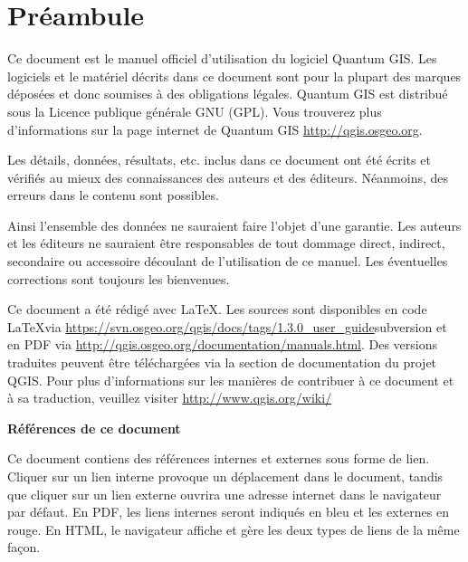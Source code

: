 \newcommand\qgistip[1]{\raggedright\small{#1}}
\renewcommand{\topfraction}{0.85}
\renewcommand{\textfraction}{0.1}
\renewcommand{\floatpagefraction}{0.75}

\thispagestyle{empty}

\section*{Préambule}

\vspace{1cm}

Ce document est le manuel officiel d'utilisation du logiciel Quantum GIS. Les logiciels et le matériel décrits dans ce document sont pour la plupart des marques déposées et donc soumises à des obligations légales. Quantum GIS est distribué sous la Licence publique générale GNU (GPL). Vous trouverez plus d'informations sur la page internet de Quantum GIS \url{http://qgis.osgeo.org}.

Les détails, données, résultats, etc. inclus dans ce document ont été écrits et vérifiés au mieux des connaissances des auteurs et des éditeurs. Néanmoins, des erreurs dans le contenu sont possibles.

Ainsi l'ensemble des données ne sauraient faire l'objet d'une garantie. Les auteurs et les éditeurs ne sauraient être responsables de tout dommage direct, indirect, secondaire ou accessoire découlant de l'utilisation de ce manuel. Les éventuelles corrections sont toujours les bienvenues.

Ce document a été rédigé avec \LaTeX. Les sources sont disponibles en code \LaTeX via \url{https://svn.osgeo.org/qgis/docs/tags/1.3.0_user_guide}{subversion} et en PDF via \url{http://qgis.osgeo.org/documentation/manuals.html}. 
Des versions traduites peuvent être téléchargées via la section de documentation du projet QGIS. Pour plus d'informations sur les manières de contribuer à ce document et à sa traduction, veuillez visiter \url{http://www.qgis.org/wiki/} 

\textbf{Références de ce document}

Ce document contiens des références internes et externes sous forme de lien. Cliquer sur un lien interne provoque un déplacement dans le document, tandis que cliquer sur un lien externe ouvrira une adresse internet dans le navigateur par défaut. En PDF, les liens internes seront indiqués en bleu et les externes en rouge. En HTML, le navigateur affiche et gère les deux types de liens de la même fa\c{c}on.


